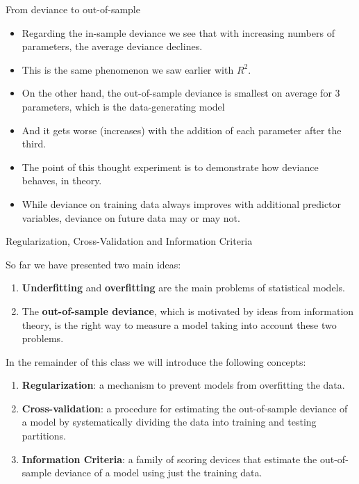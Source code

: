 \documentclass[handout]{beamer}
\begin{document}
\begin{frame}{From deviance to out-of-sample}
\scriptsize{

\begin{itemize}


\item Regarding the in-sample deviance we see that with increasing numbers of parameters, the average deviance declines. 
\item This is the same phenomenon we saw earlier with $R^2$.

\item On the other hand, the out-of-sample deviance is smallest on average for 3 parameters, which is the data-generating model
\item And it gets worse (increases) with the addition of each parameter after the third.

\item The point of this thought experiment is to demonstrate how deviance behaves, in theory. 
\item While deviance on training data always improves with additional predictor variables, deviance on future data may or may not.

\end{itemize}




} 
\end{frame}


\begin{frame}{Regularization, Cross-Validation and Information Criteria}
\scriptsize{

So far we have presented two main ideas:
\begin{enumerate}
 \item  \textbf{Underfitting} and \textbf{overfitting} are the main problems of statistical models.
 \item The \textbf{out-of-sample deviance}, which is motivated by ideas from information theory, is the right way to measure a model taking into account these two problems.
\end{enumerate}

In the remainder of this class we will introduce the following concepts:

\begin{enumerate}
 \item \textbf{Regularization}: a mechanism to prevent models from overfitting the data.
 \item \textbf{Cross-validation}: a procedure for estimating the out-of-sample deviance of a model by systematically dividing the data into training and testing partitions.
 \item \textbf{Information Criteria}: a family of scoring devices that estimate the out-of-sample deviance of a model using just the training data.
\end{enumerate}






}
\end{frame}
\end{document}
